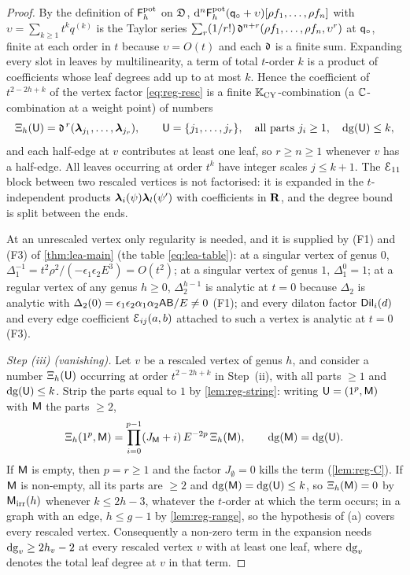 \begin{proof}
By the definition of $\mathsf{F}^{\mathrm{pot}}_h$ on $\mathfrak{D}$, $\mathrm{d}^n\mathsf{F}^{\mathrm{pot}}_h(\mathsf{q}_{\circ}+\upsilon)[\rho f_1,\dots,\rho f_n]$ with $\upsilon=\sum_{k\geq 1}t^kq^{(k)}$ is the Taylor series $\sum_r(1/r!)\,\mathfrak{d}^{n+r}(\rho f_1,\dots,\rho f_n,\upsilon^r)$ at $\mathsf{q}_{\circ}$, finite at each order in $t$ because $\upsilon=O(t)$ and each $\mathfrak{d}$ is a finite sum. Expanding every slot in leaves by multilinearity, a term of total $t$-order $k$ is a product of coefficients whose leaf degrees add up to at most $k$. Hence the coefficient of $t^{2-2h+k}$ of the vertex factor \eqref{eq:reg-resc} is a finite $\mathbb{K}_{\mathrm{CY}}$-combination (a $\mathbb{C}$-combination at a weight point) of numbers
\[
\Xi_h(\mathsf{U})=\mathfrak{d}^{\,r}(\boldsymbol{\lambda}_{j_1},\dots,\boldsymbol{\lambda}_{j_r}),\qquad \mathsf{U}=\{j_1,\dots,j_r\},\quad\text{all parts }j_i\geq 1,\quad \mathrm{dg}(\mathsf{U})\leq k,
\]
and each half-edge at $v$ contributes at least one leaf, so $r\geq n\geq 1$ whenever $v$ has a half-edge. All leaves occurring at order $t^k$ have integer scales $j\leq k+1$. The $\mathcal{E}_{11}$ block between two rescaled vertices is not factorised: it is expanded in the $t$-independent products $\boldsymbol{\lambda}_i(\psi)\boldsymbol{\lambda}_l(\psi')$ with coefficients in $\mathbf{R}$, and the degree bound is split between the ends.

At an unrescaled vertex only regularity is needed, and it is supplied by (F1) and (F3) of \cref{thm:lea-main} (the table \cref{eq:lea-table}): at a singular vertex of genus $0$, $\Delta_1^{-1}=t^2\rho^2/(-\epsilon_1\epsilon_2E^3)=O(t^2)$; at a singular vertex of genus $1$, $\Delta_1^{0}=1$; at a regular vertex of any genus $h\geq 0$, $\Delta_2^{h-1}$ is analytic at $t=0$ because $\Delta_2$ is analytic with $\Delta_2(0)=\epsilon_1\epsilon_2\alpha_1\alpha_2\mathsf{A}\mathsf{B}/E\neq 0$ (F1); and every dilaton factor $\mathsf{Dil}_i(d)$ and every edge coefficient $\mathcal{E}_{ij}(a,b)$ attached to such a vertex is analytic at $t=0$ (F3).

\emph{Step (iii) (vanishing).} Let $v$ be a rescaled vertex of genus $h$, and consider a number $\Xi_h(\mathsf{U})$ occurring at order $t^{2-2h+k}$ in Step~(ii), with all parts $\geq 1$ and $\mathrm{dg}(\mathsf{U})\leq k$. Strip the parts equal to $1$ by \cref{lem:reg-string}: writing $\mathsf{U}=(1^p,\mathsf{M})$ with $\mathsf{M}$ the parts $\geq 2$,
\[
\Xi_h(1^p,\mathsf{M})=\prod_{i=0}^{p-1}(J_{\mathsf{M}}+i)\,E^{-2p}\,\Xi_h(\mathsf{M}),\qquad\mathrm{dg}(\mathsf{M})=\mathrm{dg}(\mathsf{U}).
\]
If $\mathsf{M}$ is empty, then $p=r\geq 1$ and the factor $J_{\emptyset}=0$ kills the term (\cref{lem:reg-C}). If $\mathsf{M}$ is non-empty, all its parts are $\geq 2$ and $\mathrm{dg}(\mathsf{M})=\mathrm{dg}(\mathsf{U})\leq k$, so $\Xi_h(\mathsf{M})=0$ by $\mathsf{M}_{\mathrm{irr}}(h)$ whenever $k\leq 2h-3$, whatever the $t$-order at which the term occurs; in a graph with an edge, $h\leq g-1$ by \cref{lem:reg-range}, so the hypothesis of (a) covers every rescaled vertex. Consequently a non-zero term in the expansion needs $\mathrm{dg}_v\geq 2h_v-2$ at every rescaled vertex $v$ with at least one leaf, where $\mathrm{dg}_v$ denotes the total leaf degree at $v$ in that term.


\end{proof}
